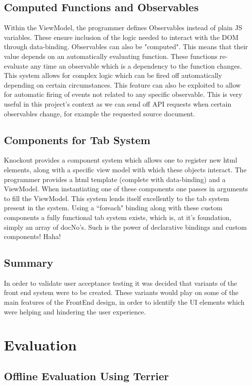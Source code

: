 \documentclass{l4proj}
\begin{document}
\section{Computed Functions and Observables}
Within the ViewModel, the programmer defines Observables instead of plain JS variables. These ensure inclusion of the logic needed to interact with the DOM through data-binding. Observables can also be "computed". This means that their value depends on an automatically evaluating function. These functions re-evaluate any time an observable which is a dependency to the function changes. This system allows for complex logic which can be fired off automatically depending on certain circumstances.
This feature can also be exploited to allow for automatic firing of events not related to any specific observable. This is very useful in this project's context as we can send off API requests when certain observables change, for example the requested source document.

\section{Components for Tab System}
Knockout provides a component system which allows one to register new html elements, along with a specific view model with which these objects interact. The programmer provides a html template (complete with data-binding) and a ViewModel. When instantiating one of these components one passes in arguments to fill the ViewModel.
This system lends itself excellently to the tab system present in the system. Using a ``foreach" binding along with these custom components a fully functional tab system exists, which is, at it's foundation, simply an array of docNo's. Such is the power of declarative bindings and custom components! Haha!

\section{Summary}
In order to validate user acceptance testing it was decided that variants of the front end system were to be created. These variants would play on some of the main features of the FrontEnd design, in order to identify the UI elements which were helping and hindering the user experience.

\chapter{Evaluation}
\section{Offline Evaluation Using Terrier}
\end{document}
